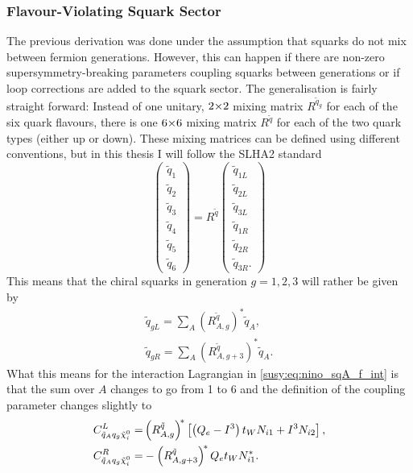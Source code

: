 \documentclass[../main.tex]{subfiles}
\begin{document}
\subsubsection*{Flavour-Violating Squark Sector}
The previous derivation was done under the assumption that squarks do not mix between fermion generations.
However, this can happen if there are non-zero supersymmetry-breaking parameters coupling squarks between generations or if loop corrections are added to the squark sector.
The generalisation is fairly straight forward: Instead of one unitary, \(2 {\times} 2\) mixing matrix \(R^{\tilde{q}_g}\) for each of the six quark flavours, there is one \(6 {\times} 6\) mixing matrix \(R^{\tilde{q}}\) for each of the two quark types (either up or down).
These mixing matrices can be defined using different conventions, but in this thesis I will follow the SLHA2 standard~\cite{SLHA2}
\begin{equation}
  \begin{pmatrix}
    \tilde{q}_1 \\ \tilde{q}_2 \\ \tilde{q}_3 \\ \tilde{q}_4 \\ \tilde{q}_5 \\ \tilde{q}_6
  \end{pmatrix}
  = R^{\tilde{q}} \begin{pmatrix}
    \tilde{q}_{1L} \\ \tilde{q}_{2L} \\ \tilde{q}_{3L} \\ \tilde{q}_{1R} \\ \tilde{q}_{2R} \\ \tilde{q}_{3R}.
  \end{pmatrix}
\end{equation}
This means that the chiral squarks in generation \(g = 1,2,3\) will rather be given by
\begin{subequations}
  \begin{align}
    \tilde{q}_{gL} = \sum_A (R^{\tilde{q}}_{A,g})^\ast \tilde{q}_A, \\
    \tilde{q}_{gR} = \sum_A (R^{\tilde{q}}_{A,g+3})^\ast \tilde{q}_A.
  \end{align}
\end{subequations}
What this means for the interaction Lagrangian in \cref{susy:eq:nino_sqA_f_int} is that the sum over \(A\) changes to go from 1 to 6 and the definition of the coupling parameter changes slightly to
\begin{subequations}
  \begin{align}
    C_{\tilde{q}_A q_g \tilde{\chi}_i^0}^{L} = & \left(R^{\tilde{q}}_{A,g}\right)^{\!\ast} \left[\left(Q_e-I^3\right)t_W N_{i1} + I^3 N_{i2}\right], \\
    C_{\tilde{q}_A q_g \tilde{\chi}_i^0}^{R} = & -\left(R^{\tilde{q}}_{A,g+3}\right)^{\!\ast} Q_e t_W N_{i1}^\ast.
  \end{align}
\end{subequations}
\end{document}
